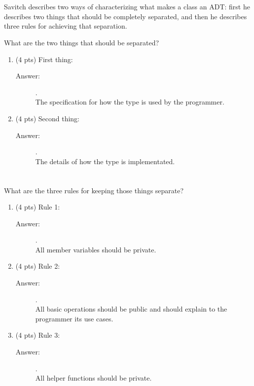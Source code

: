 \documentclass[11pt]{article}
\begin{document}
\section{}
\label{sec:orge0ca3b4}

Savitch describes two ways of characterizing what makes a class an ADT:
first he describes two things that should be completely separated, and
then he describes three rules for achieving that separation.

What are the two things that should be separated?

\begin{enumerate}
\item (4 pts) First thing:
\begin{description}
    \item[Answer:] .\\
    The specification for how the type is used by the programmer.
\end{description}
\item (4 pts) Second thing:
\begin{description}
    \item[Answer:] .\\
     The details of how the type is implementated.
\end{description}
\end{enumerate}

\section{}
\label{sec:org98e459a}
What are the three rules for keeping those things separate?

\begin{enumerate}
\item (4 pts) Rule 1:
\begin{description}
    \item[Answer:] .\\
    All member variables should be private.
\end{description}
\item (4 pts) Rule 2:
\begin{description}
    \item[Answer:] .\\
    All basic operations should be public and should explain to the programmer its use cases.
\end{description}
\item (4 pts) Rule 3:
\begin{description}
    \item[Answer:] .\\
    All helper functions should be private.
\end{description}
\end{enumerate}
\end{document}
